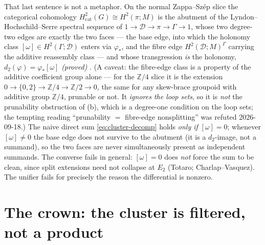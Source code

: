 \documentclass[11pt]{report}
\theoremstyle{plain}
\theoremstyle{definition}
\theoremstyle{remark}
\newcommand{\Hcoh}{H^2}
\newcommand{\Z}{\mathbb{Z}}
\begin{document}
That last sentence is not a metaphor. On the normal Zappa--Sz\'ep slice the
categorical cohomology $\Hcoh_{\mathrm{cat}}(G)\cong\Hcoh(\pi;M)$ is the abutment
of the Lyndon--Hochschild--Serre spectral sequence of
$1\to\mathcal D\to\pi\to\Gamma\to1$, whose two degree-two edges are exactly the
two faces --- the base edge, into which the holonomy class
$[\omega]\in\Hcoh(\Gamma;\mathcal D)$ enters via $\varphi_*$,
and the fibre edge $\Hcoh(\mathcal D;M)^{\Gamma}$ carrying the additive reassembly
class --- and whose transgression \emph{is} the holonomy,
$d_2(\varphi)=\varphi_*[\omega]$ \emph{(proved)} \cite{cl-h2edges}. (A caveat: the
fibre-edge class is a property of the additive coefficient group alone --- for the
$\Z/4$ slice it is the extension $0\to\{0,2\}\to\Z/4\to\Z/2\to0$, the same for any
skew-brace groupoid with additive group $\Z/4$, prunable or not. It \emph{ignores
the loop sets}, so it is \emph{not} the prunability obstruction of (b), which is a
degree-one condition on the loop sets; the tempting reading ``prunability $=$
fibre-edge nonsplitting'' was refuted 2026-09-18.) The naive
direct sum \eqref{eq:cluster-decomp} holds \emph{only if} $[\omega]=0$;
whenever $[\omega]\neq0$ the base edge does not survive to the abutment (it is a
$d_2$-image, not a summand), so the two faces are never simultaneously present as
independent summands. The converse fails in general: $[\omega]=0$ does \emph{not}
force the sum to be clean, since split extensions need not collapse at $E_2$
(Totaro; Charlap--Vasquez). The unifier fails for precisely the reason the
differential is nonzero.

\section{The crown: the cluster is filtered, not a product}\label{sec:cluster-crown}
\end{document}

